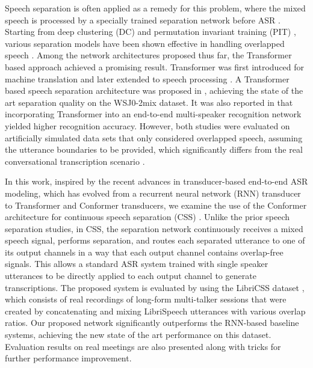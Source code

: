 \documentclass{article}
\begin{document}
	Speech separation is often applied as a remedy for this problem, where the mixed speech is  processed by a specially trained separation network before ASR . 
	Starting from deep clustering (DC) \cite{hershey2016deep} and permutation invariant training (PIT) \cite{yu2017permutation, kolbaek2017multitalker}, various separation models have been shown effective in handling overlapped speech \cite{yoshioka2019advances,luo2019conv,luo2020dual,chen2020dual}. 
Among the network architectures proposed thus far, the Transformer \cite{chen2020dual} based approach achieved a promising result. Transformer was first introduced  for machine translation \cite{vaswani2017attention} and later extended to speech processing  \cite{dong2018speech}. A Transformer based speech separation architecture was proposed in \cite{chen2020dual}, 
	achieving the state of the art separation quality on the WSJ0-2mix dataset. It was also reported in \cite{chang2020end} that incorporating Transformer into an end-to-end multi-speaker recognition network yielded higher recognition accuracy. 
However, both studies were evaluated on artificially simulated data sets that only considered overlapped speech, assuming the utterance boundaries to be provided, which significantly differs from the real conversational transcription scenario \cite{yoshioka2019advances,chen2020continuous}.




	
	In this work, 
	inspired by the recent advances in transducer-based end-to-end ASR modeling, which has evolved from a recurrent neural network (RNN) transducer \cite{he2019streaming} to Transformer \cite{zhang2020transformer} and Conformer \cite{gulati2020conformer} transducers, we examine the use of the  Conformer architecture for continuous speech separation (CSS) \cite{yoshioka2018multi}. Unlike the prior speech separation studies, in CSS, the separation network continuously receives a mixed speech signal, performs separation, and routes each separated utterance to one of its output channels in a way that each output channel contains overlap-free signals. 
	This allows a standard ASR system trained with single speaker utterances to be directly applied to each output channel to generate transcriptions.
	The proposed system is evaluated by using the LibriCSS dataset \cite{chen2020continuous}, which consists of real recordings of long-form multi-talker sessions that were created by concatenating and mixing LibriSpeech utterances with various overlap ratios.
	Our proposed network significantly outperforms the RNN-based baseline systems, achieving the new state of the art performance on this dataset. 
Evaluation results on real meetings are also presented along with tricks for further performance improvement.  
\end{document}
